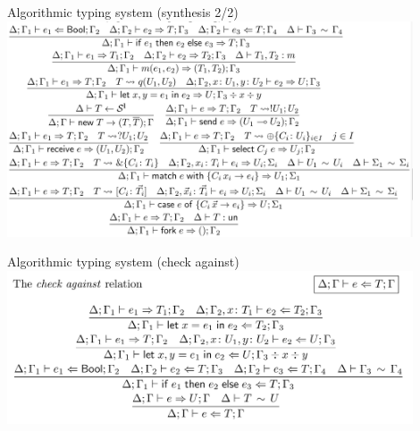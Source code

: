 \documentclass[10pt]{beamer}
\begin{document}
{\begin{frame}{Algorithmic typing system (synthesis 2/2)}
	\hspace*{-8mm}\includegraphics[width=12cm]{img/type-synth2}	
\end{frame}

\begin{frame}{Algorithmic typing system (check against)}
	\hspace*{-8mm}\includegraphics[width=12cm]{img/type-check-against}	
\end{frame}


}
\end{document}
